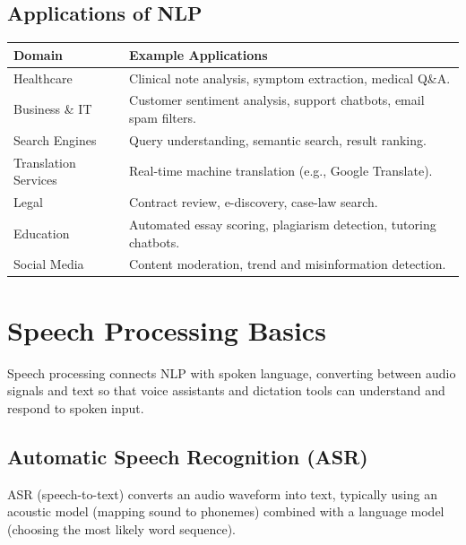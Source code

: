 \documentclass[11pt,a4paper]{article}
\begin{document}
\subsection{Applications of NLP}
\begin{longtable}{@{}p{3.5cm}p{10cm}@{}}
\toprule
\rowcolor{primary!15}
\textbf{Domain} & \textbf{Example Applications} \\
\midrule
\endhead
Healthcare & Clinical note analysis, symptom extraction, medical Q\&A. \\
\addlinespace
Business \& IT & Customer sentiment analysis, support chatbots, email spam filters. \\
\addlinespace
Search Engines & Query understanding, semantic search, result ranking. \\
\addlinespace
Translation Services & Real-time machine translation (e.g., Google Translate). \\
\addlinespace
Legal & Contract review, e-discovery, case-law search. \\
\addlinespace
Education & Automated essay scoring, plagiarism detection, tutoring chatbots. \\
\addlinespace
Social Media & Content moderation, trend and misinformation detection. \\
\bottomrule
\end{longtable}

\section{Speech Processing Basics}

\begin{definitionbox}
Speech processing connects NLP with spoken language, converting between audio signals and text so that voice assistants and dictation tools can understand and respond to spoken input.
\end{definitionbox}

\subsection{Automatic Speech Recognition (ASR)}
\begin{conceptbox}[ASR]
ASR (speech-to-text) converts an audio waveform into text, typically using an acoustic model (mapping sound to phonemes) combined with a language model (choosing the most likely word sequence).
\end{conceptbox}
\end{document}
